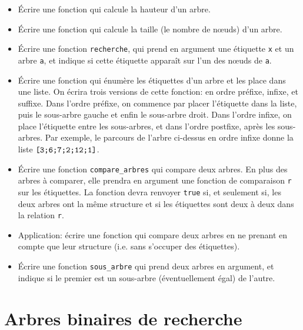 \documentclass[11pt, a4paper]{article}
\begin{document}
\begin{itemize}

  \item Écrire une fonction qui calcule la hauteur d'un arbre.

  \item Écrire une fonction qui calcule la taille (le nombre de nœuds)
        d'un arbre.

  \item Écrire une fonction {\tt recherche}, qui prend en argument une
        étiquette {\tt x} et un arbre {\tt a}, et indique si cette
        étiquette apparaît sur l'un des nœuds de {\tt a}.

  \item Écrire une fonction qui énumère les étiquettes d'un arbre et
        les place dans une liste. On écrira trois versions de cette
        fonction: en ordre préfixe, infixe, et suffixe. Dans l'ordre
        préfixe, on commence par placer l'étiquette dans la liste,
        puis le sous-arbre gauche et enfin le sous-arbre droit. Dans
        l'ordre infixe, on place l'étiquette entre les sous-arbres, et
        dans l'ordre postfixe, après les sous-arbres. Par exemple, le
        parcours de l'arbre ci-dessus en ordre infixe donne la liste
        $\verb+[3;6;7;2;12;1]+$.

  \item Écrire une fonction {\tt compare\_arbres} qui compare deux
        arbres. En plus des arbres à comparer, elle prendra en
        argument une fonction de comparaison {\tt r} sur les
        étiquettes. La fonction devra renvoyer {\tt true} si, et
        seulement si, les deux arbres ont la même structure et si les
        étiquettes sont deux à deux dans la relation {\tt r}.

  \item Application: écrire une fonction qui compare deux arbres en ne
        prenant en compte que leur structure (i.e.  sans s'occuper des
        étiquettes).

  \item Écrire une fonction {\tt sous\_arbre} qui prend deux arbres en
        argument, et indique si le premier est un sous-arbre
        (éventuellement égal) de l'autre.

\end{itemize}


\section{Arbres binaires de recherche}
\end{document}
